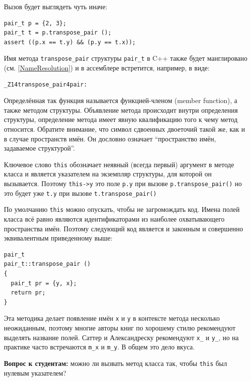 \documentclass[a4paper,12pt,oneside]{article}
\begin{document}
Вызов будет выглядеть чуть иначе:

\begin{lstlisting}
pair_t p = {2, 3};
pair_t t = p.transpose_pair ();
assert ((p.x == t.y) && (p.y == t.x));
\end{lstlisting}

Имя метода \lstinline!transpose_pair! структуры \lstinline!pair_t! в C++ также будет манглировано (см. \ref{NameResolution}) и в ассемблере встретится, например, в виде:

\begin{verbatim}
_Z14transpose_pair4pair:
\end{verbatim}

Определённая так функция называется функцией-членом (member function), а также методом структуры. Объявление метода происходит внутри определения структуры, определение метода имеет явную квалификацию того к чему метод относится. Обратите внимание, что символ сдвоенных двоеточий такой же, как и в случае пространств имён. Он дословно означает ``пространство имён, задаваемое структурой''.

Ключевое слово \lstinline!this! обозначает неявный (всегда первый) аргумент в методе класса и является указателем на экземпляр структуры, для которой он вызывается. Поэтому \lstinline!this->y! это поле \lstinline!p.y! при вызове \lstinline!p.transpose_pair()! но это будет уже \lstinline!t.y! при вызове \lstinline!t.transpose_pair()!

По умолчанию \lstinline!this! можно опускать, чтобы не загромождать код. Имена полей класса всё равно являются идентификаторами из наиболее охватывающего пространства имён. Поэтому следующий код является и законным и совершенно эквивалентным приведенному выше:

\begin{lstlisting}
pair_t 
pair_t::transpose_pair ()
{
  pair_t pr = {y, x};
  return pr;
} 
\end{lstlisting}

Эта методика делает появление имён \lstinline!x! и \lstinline!y! в контексте метода несколько неожиданным, поэтому многие авторы книг по хорошему стилю рекомендуют выделять название полей. Саттер и Александреску \cite{sutteralexandresku} рекомендуют \lstinline!x_! и \lstinline!y_!, но на практике часто встречаются \lstinline!m_x! и \lstinline!m_y!. В общем это дело вкуса.

\textbf{Вопрос к студентам:} можно ли вызвать метод класса так, чтобы \lstinline!this! был нулевым указателем?
\end{document}
